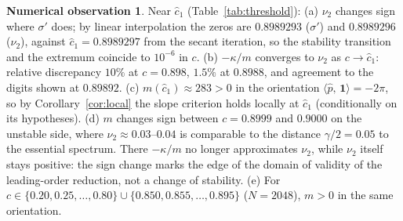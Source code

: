 \documentclass[11pt]{article}
\theoremstyle{plain}
\theoremstyle{definition}
\newtheorem{observation}[theorem]{Numerical observation}
\theoremstyle{remark}
\newcommand{\ip}[2]{\langle #1,\,#2\rangle}
\newcommand{\ph}{\hat p}
\newcommand{\one}{\mathbf 1}
\newcommand{\chat}{\hat c_1}
\begin{document}
\begin{observation}\label{obs:threshold}
Near $\chat$ (Table~\ref{tab:threshold}): (a) $\nu_2$ changes sign where $\sigma'$ does;
by linear interpolation the zeros are $0.8989293$ ($\sigma'$) and $0.8989296$ ($\nu_2$),
against $\chat=0.8989297$ from the secant iteration, so the stability transition and the
extremum coincide to $10^{-6}$ in $c$. (b) $-\kappa/m$ converges to $\nu_2$ as
$c\to\chat$: relative discrepancy $10\%$ at $c=0.898$, $1.5\%$ at $0.8988$, and agreement to the
digits shown at $0.89892$. (c) $m(\chat)\approx283>0$ in the orientation
$\ip{\ph}{\one}=-2\pi$, so by Corollary~\ref{cor:local} the slope criterion holds locally at
$\chat$ (conditionally on its hypotheses). (d) $m$ changes sign between $c=0.8999$ and
$0.9000$ on the unstable side, where $\nu_2\approx0.03$--$0.04$ is comparable to the distance
$\gamma/2=0.05$ to the essential spectrum. There $-\kappa/m$ no longer approximates
$\nu_2$, while $\nu_2$ itself stays positive: the sign change marks the edge of the domain of
validity of the leading-order reduction, not a change of stability. (e) For
$c\in\{0.20,0.25,\dots,0.80\}\cup\{0.850,0.855,\dots,0.895\}$ ($N=2048$), $m>0$ in the same
orientation.
\end{observation}
\end{document}
